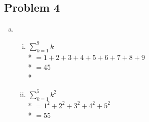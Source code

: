 \documentclass[a4paper]{article}
\begin{document}
  \subsection*{Problem 4}
  \begin{enumerate}[a)]
    \item \begin{enumerate}[i.]
      \item $\sum\limits_{k=1}^{9}k$\\*
      $= 1+2+3+4+5+6+7+8+9$\\*
      $= 45$
      \\*
      \item $\sum\limits_{k=1}^{5}k^2$\\*
      $= 1^2+2^2+3^2+4^2+5^2$\\*
      $= 55$

    \end{enumerate}
  \end{enumerate}
\end{document}
